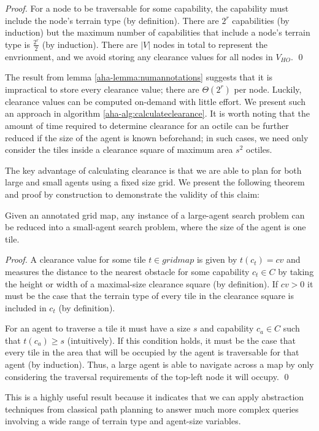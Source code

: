 \begin{proof}
For a node to be traversable for some capability, the capability must include the node's terrain type (by definition). 
There are $2^r$ capabilities (by induction) but the maximum number of capabilities that include a node's terrain type is $\frac{2^r}{2}$ (by induction). 
There are $|V|$ nodes in total to represent the envrionment, and we avoid storing any clearance values for all nodes in $V_{HO}$. 
\qed
\end{proof}

The result from lemma \ref{aha-lemma:numannotations} suggests that it is impractical to store every clearance value; there are $\Theta(2^r)$ per node.
Luckily, clearance values can be computed on-demand with little effort. 
We present such an approach in algorithm \ref{aha-alg:calculateclearance}. 
It is worth noting that the amount of time required to determine clearance for an octile can be further reduced if the size of the agent is known beforehand; in such cases, we need only consider the tiles inside a clearance square of maximum area $s^2$ octiles.

\par \indent
The key advantage of calculating clearance is that we are able to plan for both large and small agents using a fixed size grid. We present the following theorem and proof by construction to demonstrate the validity of this claim:
\begin{theorem}
\label{aha-theorem:reducibility}
Given an annotated grid map, any instance of a large-agent search problem can be reduced into a small-agent search problem, where the size of the agent is one tile.
\end{theorem}

\begin{proof}
A clearance value for some tile $t \in gridmap$ is given by $t(c_{t}) = cv$ and measures the distance to the nearest obstacle for some capability $c_{t} \in C$ by taking the height or width of a maximal-size clearance square (by definition). 
If $cv > 0$ it must be the case that the terrain type of every tile in the clearance square is included in $c_{t}$ (by definition). 
\par \indent
For an agent to traverse a tile it must have a size $s$ and capability $c_{a} \in C$ such that $t(c_{a}) \geq s$ (intuitively).
If this condition holds, it must be the case that every tile in the area that will be occupied by the agent is traversable for that agent (by induction). 
Thus, a large agent is able to navigate across a map by only considering the traversal requirements of the top-left node it will occupy. \qed
\end{proof}
This is a highly useful result because it indicates that we can apply abstraction techniques from classical path planning to answer much more complex queries involving a wide range of terrain type and agent-size variables.
